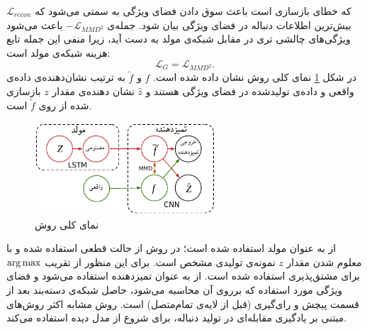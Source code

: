 $\mathcal{L}_{recon}$
که خطای بازسازی است باعث سوق دادن فضای ویژگی به سمتی می‌شود که بیش‌ترین اطلاعات دنباله در فضای ویژگی بیان شود. جمله‌ی
$ - \mathcal{L}_{MMD^2}$
باعث می‌شود ویژگی‌های چالشی تری در مقابل شبکه‌ی مولد به دست آید، زیرا منفی این جمله تابع هزینه شبکه‌ی مولد است:
\begin{equation}
 \mathcal{L}_{G} =  \mathcal{L}_{MMD^2} .
\end{equation}
\newline
 در شکل 
 \ref{Figure:TextGAN:Architecture}
 نمای کلی روش نشان داده شده است.
 $f$
 و
 $\tilde{f}$
 به ترتیب نشان‌دهنده‌ی داده‌ی واقعی و داده‌ی تولید‌شده در فضای ویژگی هستند و 
 $\hat{z}$
 نشان دهنده‌ی مقدار $z$ بازسازی شده از روی
 $\tilde{f}$
 است.
 \begin{figure}[!htb]
 	\centering
 	\includegraphics[width=0.6\textwidth]{images/ArchitectureTextGAN.pdf} 
 	\caption[نمای کلی روش 
 	]
 	{
 		نمای کلی روش 
 		 \cite{Zhang2017TextGAN}
 	}
 	\label{Figure:TextGAN:Architecture}
 \end{figure}
 \newline
 از
 به عنوان مولد استفاده شده است؛
در روش
 از حالت قطعی استفاده شده و با معلوم شدن مقدار $z$ نمونه‌ی تولیدی مشخص است. برای این منظور از تقریب
 $\operatorname*{arg\,max}$
برای مشتق‌پذیری استفاده شده است. از
به عنوان تمیزدهنده استفاده می‌شود و فضای ویژگی مورد استفاده که برروی آن
محاسبه می‌شود، حاصل شبکه‌ی دسته‌بند بعد از قسمت پیچش و رای‌گیری (قبل از لایه‌ی تمام‌متصل) است.
\newline
روش
 مشابه اکثر روش‌های مبتنی بر یادگیری مقابله‌ای در تولید دنباله، برای شروع از مدل 
  دیده استفاده می‌کند.

